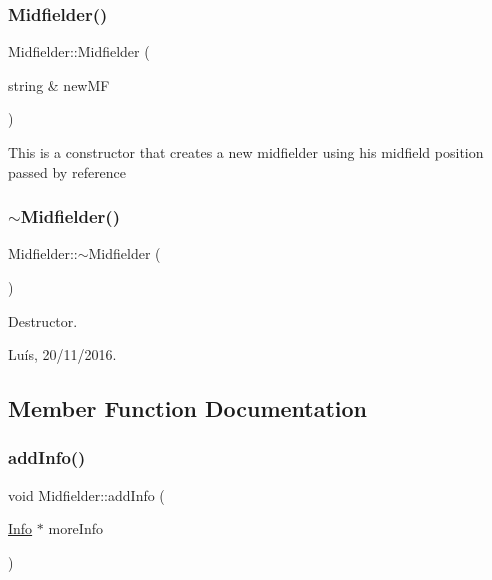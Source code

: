 \subsubsection{\texorpdfstring{Midfielder()}{Midfielder()}\hspace{0.1cm}{\footnotesize\ttfamily [2/2]}}
{\footnotesize\ttfamily Midfielder\+::\+Midfielder (\begin{DoxyParamCaption}\item[{string \&}]{new\+MF }\end{DoxyParamCaption})}

This is a constructor that creates a new midfielder using his midfield position passed by reference \hypertarget{class_midfielder_ae0d6c23126b9c08ea3c3a58222d4118f}{}\label{class_midfielder_ae0d6c23126b9c08ea3c3a58222d4118f} 
\subsubsection{\texorpdfstring{$\sim$\+Midfielder()}{~Midfielder()}}
{\footnotesize\ttfamily Midfielder\+::$\sim$\+Midfielder (\begin{DoxyParamCaption}{ }\end{DoxyParamCaption})}



Destructor. 

Luís, 20/11/2016. 

\subsection{Member Function Documentation}
\hypertarget{class_midfielder_aca69e728b57110b3f34de94556465c0a}{}\label{class_midfielder_aca69e728b57110b3f34de94556465c0a} 
\subsubsection{\texorpdfstring{add\+Info()}{addInfo()}}
{\footnotesize\ttfamily void Midfielder\+::add\+Info (\begin{DoxyParamCaption}\item[{\hyperlink{class_info}{Info} $\ast$}]{more\+Info }\end{DoxyParamCaption})\hspace{0.3cm}{\ttfamily [virtual]}}

